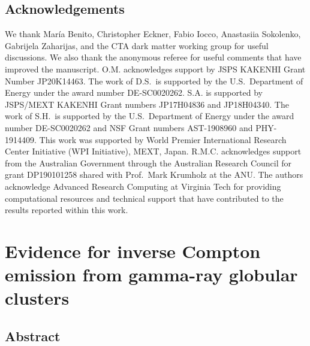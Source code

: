 \documentclass[doublespace,nopageskip]{VTthesis}
\begin{document}



\section*{Acknowledgements}

We thank Mar\'ia Benito, Christopher Eckner, Fabio Iocco,  Anastasiia Sokolenko, Gabrijela Zaharijas, and the CTA dark matter working group for useful discussions. We also thank the anonymous referee for useful comments that have improved the manuscript. O.M. acknowledges support by JSPS KAKENHI Grant Number JP20K14463.  The work of D.S.\ is supported by the U.S.\ Department of Energy under the award number DE-SC0020262.
S.A. is supported by JSPS/MEXT KAKENHI Grant numbers JP17H04836 and JP18H04340.
The work of S.H.\ is supported by the U.S.\ Department of Energy under the award number DE-SC0020262 and NSF Grant numbers AST-1908960 and PHY-1914409. This work was supported by World Premier International Research Center Initiative (WPI Initiative), MEXT, Japan. R.M.C. acknowledges support from the Australian Government through the Australian Research Council for grant DP190101258 shared with Prof.~Mark Krumholz at the ANU. The authors acknowledge Advanced Research Computing at Virginia Tech for providing computational resources and technical support that have contributed to the results reported within this work.

\chapter{Evidence for inverse Compton emission from gamma-ray globular clusters} \label{ch:globular_cluster}

\section{Abstract}
\end{document}
